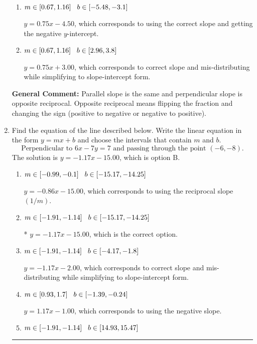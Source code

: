 \documentclass{extbook}[14pt]
\newcommand{\litem}[1]{\item #1

\rule{\textwidth}{0.4pt}}
\begin{document}
\begin{enumerate}
{\begin{enumerate}[label=\Alph*.]
 $y = -0.75x + 13.50$, which corresponds to using the negative slope.
\item \( m \in [0.67, 1.16] \hspace*{3mm} b \in [-5.48, -3.1] \)

 $y = 0.75x - 4.50$, which corresponds to using the correct slope and getting the negative $y$-intercept.
\item \( m \in [0.67, 1.16] \hspace*{3mm} b \in [2.96, 3.8] \)

 $y = 0.75x + 3.00$, which corresponds to correct slope and mis-distributing while simplifying to slope-intercept form.
\end{enumerate}

\textbf{General Comment:} Parallel slope is the same and perpendicular slope is opposite reciprocal. Opposite reciprocal means flipping the fraction and changing the sign (positive to negative or negative to positive).
}
\litem{
Find the equation of the line described below. Write the linear equation in the form $ y=mx+b $ and choose the intervals that contain $m$ and $b$.
\[ \text{Perpendicular to } 6 x - 7 y = 7 \text{ and passing through the point } (-6, -8). \]The solution is \( y = -1.17x - 15.00 \), which is option B.\begin{enumerate}[label=\Alph*.]
\item \( m \in [-0.99, -0.1] \hspace*{3mm} b \in [-15.17, -14.25] \)

 $y = -0.86x - 15.00$, which corresponds to using the reciprocal slope $(1/m)$.
\item \( m \in [-1.91, -1.14] \hspace*{3mm} b \in [-15.17, -14.25] \)

* $y = -1.17x - 15.00$, which is the correct option.
\item \( m \in [-1.91, -1.14] \hspace*{3mm} b \in [-4.17, -1.8] \)

 $y = -1.17x - 2.00$, which corresponds to correct slope and mis-distributing while simplifying to slope-intercept form.
\item \( m \in [0.93, 1.7] \hspace*{3mm} b \in [-1.39, -0.24] \)

 $y = 1.17x - 1.00$, which corresponds to using the negative slope.
\item \( m \in [-1.91, -1.14] \hspace*{3mm} b \in [14.93, 15.47] \)


\end{enumerate}}
\end{enumerate}
\end{document}
